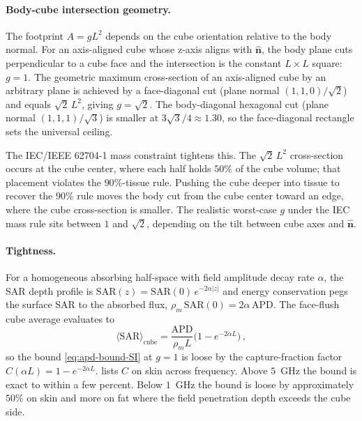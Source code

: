 \documentclass[journal,twocolumn,10pt]{IEEEtran}
\theoremstyle{plain}
\theoremstyle{remark}
\newcommand{\nhat}{\hat{\bm{n}}}
\newcommand{\APD}{\mathrm{APD}}
\begin{document}
\paragraph{Body-cube intersection geometry.}
The footprint $A = g L^2$ depends on the cube orientation relative to
the body normal. For an axis-aligned cube whose z-axis aligns with
$\nhat$, the body plane cuts perpendicular to a cube face and the
intersection is the constant $L \times L$ square: $g = 1$.
The geometric maximum cross-section of an axis-aligned cube by an
arbitrary plane is achieved by a face-diagonal cut (plane normal
$(1,1,0)/\sqrt{2}$) and equals $\sqrt{2}\,L^2$, giving $g = \sqrt{2}$.
The body-diagonal hexagonal cut (plane normal $(1,1,1)/\sqrt{3}$) is
smaller at $3\sqrt{3}/4 \approx 1.30$, so the face-diagonal rectangle
sets the universal ceiling.

The IEC/IEEE 62704-1 mass constraint tightens this. The
$\sqrt{2}\,L^2$ cross-section occurs at the cube center, where each
half holds $50\%$ of the cube volume; that placement violates the
$90\%$-tissue rule. Pushing the cube deeper into tissue to recover
the $90\%$ rule moves the body cut from the cube center toward an
edge, where the cube cross-section is smaller. The realistic worst-case
$g$ under the IEC mass rule sits between $1$ and $\sqrt{2}$, depending
on the tilt between cube axes and $\nhat$.

\paragraph{Tightness.}
For a homogeneous absorbing half-space with field amplitude decay
rate $\alpha$, the SAR depth profile is
$\mathrm{SAR}(z) = \mathrm{SAR}(0)\,e^{-2\alpha|z|}$ and energy
conservation pegs the surface SAR to the absorbed flux,
$\rho_m\,\mathrm{SAR}(0) = 2\alpha\,\APD$. The face-flush cube average
evaluates to
\begin{equation}\label{eq:cube-tightness-SI}
  \langle\mathrm{SAR}\rangle_{\mathrm{cube}}
  = \frac{\APD}{\rho_m L}\bigl(1 - e^{-2\alpha L}\bigr)\, ,
\end{equation}
so the bound \eqref{eq:apd-bound-SI} at $g = 1$ is loose by the
capture-fraction factor $C(\alpha L) = 1 - e^{-2\alpha L}$.
 lists $C$ on skin across frequency. Above
$5$~GHz the bound is exact to within a few percent. Below $1$~GHz the
bound is loose by approximately $50\%$ on skin and more on fat where
the field penetration depth exceeds the cube side.
\end{document}
